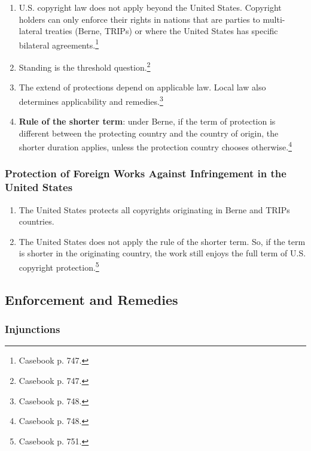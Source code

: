 \begin{enumerate}
    \item U.S. copyright law does not apply beyond the United States. 
    Copyright holders can only enforce their rights in nations that are 
    parties to multi-lateral treaties (Berne, TRIPs) or where the United 
    States has specific bilateral agreements.\footnote{Casebook p. 747.}
    \item Standing is the threshold question.\footnote{Casebook p. 747.}
    \item The extend of protections depend on applicable law. Local law also 
    determines applicability and remedies.\footnote{Casebook p. 748.}
    \item \textbf{Rule of the shorter term}: under Berne, if the term of 
    protection is different between the protecting country and the country of 
    origin, the shorter duration applies, unless the protection country 
    chooses otherwise.\footnote{Casebook p. 748.}
\end{enumerate}

\subsubsection{Protection of Foreign Works Against Infringement in the United 
States}

\begin{enumerate}
    \item The United States protects all copyrights originating in Berne and 
    TRIPs countries.
    \item The United States does not apply the rule of the shorter term. So, 
    if the term is shorter in the originating country, the work still enjoys 
    the full term of U.S. copyright protection.\footnote{Casebook p. 751.}
\end{enumerate}

\subsection{Enforcement and Remedies}

\subsubsection{Injunctions}

